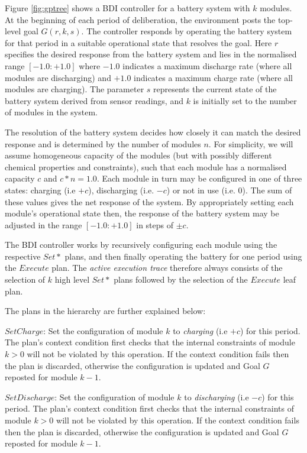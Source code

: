 Figure \ref{fig:gptree} shows a BDI controller for a battery system with $k$ modules. At the beginning of each period of deliberation, the environment posts the top-level goal $G(r,k,s)$. The controller responds by operating the battery system for that period in a suitable operational state that resolves the goal. Here $r$ specifies the desired response from the battery system and lies in the normalised range $[-1.0:+1.0]$ where $-1.0$ indicates a maximum discharge rate (where all modules are discharging) and $+1.0$ indicates a maximum charge rate (where all modules are charging). The parameter $s$ represents the current state of the battery system derived from sensor readings, and $k$ is initially set to the number of modules in the system. 

The resolution of the battery system decides how closely it can match the desired response and is determined by the number of modules $n$. For simplicity, we will assume homogeneous capacity of the modules (but with possibly different chemical properties and constraints), such that each module has a normalised capacity $c$ and $c*n=1.0$. Each module in turn may be configured in one of three states: charging (i.e $+c$), discharging (i.e. $-c$) or not in use (i.e. $0$). The sum of these values gives the net response of the system. By appropriately setting each module's operational state then, the response of the battery system may be adjusted in the range $[-1.0:+1.0]$ in steps of $\pm c$.

The BDI controller works by recursively configuring each module using the respective $Set*$ plans, and then finally operating the battery for one period using the $Execute$ plan. The {\em active execution trace} therefore always consists of the selection of $k$ high level $Set*$ plans followed by the selection of the $Execute$ leaf plan. 

The plans in the hierarchy are further explained below:

$SetCharge$: Set the configuration of module $k$ to {\em charging} (i.e $+c$) for this period. The plan's context condition first checks that the internal constraints of module $k>0$ will not be violated by this operation. If the context condition fails then the plan is discarded, otherwise the configuration is updated and Goal $G$ reposted for module $k-1$.

$SetDischarge$: Set the configuration of module $k$ to {\em discharging} (i.e $-c$) for this period. The plan's context condition first checks that the internal constraints of module $k>0$ will not be violated by this operation. If the context condition fails then the plan is discarded, otherwise the configuration is updated and Goal $G$ reposted for module $k-1$.

